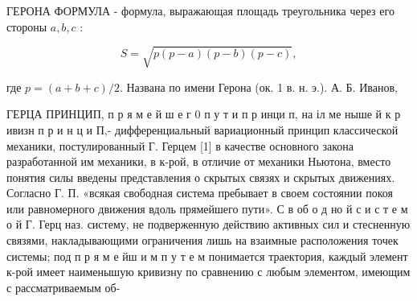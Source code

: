 \documentclass[10pt]{article}
\begin{document}
ГЕРОНА ФОРМУЛА - формула, выражающая площадь треугольника через его стороны $a, b, c$ :



\[

S=\sqrt{p(p-a)(p-b)(p-c)},

\]



где $p=(a+b+c) / 2$. Названа по имени Герона (ок. 1 в. н. э.). А. Б. Иванов,



ГЕРЦА ПРИНЦИП, п р я м е й ш е г 0 п у т и п р инци п, на іл ме ныше й к р ивизн п р и н ц и П,- дифференциальный вариационный принцип классической механики, постулированный Г. Герцем [1] в качестве основного закона разработанной им механики, в к-рой, в отличие от механики Ньютона, вместо понятия силы введены представления о скрытых связях и скрытых движениях. Согласно Г. П. «всякая свободная система пребывает в своем состоянии покоя или равномерного движения вдоль прямейшего пути». С в об о д но й с и с т е м о й Г. Герц наз. систему, не подверженную действию активных сил и стесненную связями, накладывающими ограничения лишь на взаимные расположения точек системы; под п р я м е йш и м п у т е м понимается траектория, каждый элемент к-рой имеет наименышую кривизну по сравнению с любым элементом, имеющим с рассматриваемым об-
\end{document}
